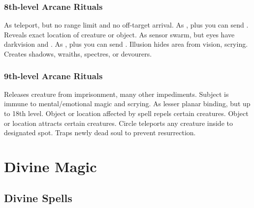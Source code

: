 \subsubsection{8th-level Arcane Rituals}
\begin{rituallist}
     As teleport, but no range limit and no off-target arrival.
     As , plus you can send .
     Reveals exact location of creature or object.
     As sensor swarm, but eyes have darkvision and .
     As , plus you can send .
     Illusion hides area from vision, scrying.
    \M Creates shadows, wraiths, spectres, or devourers.
\end{rituallist}

\subsubsection{9th-level Arcane Rituals}
\begin{rituallist}
     Releases creature from imprisonment, many other impediments.
     Subject is immune to mental/emotional magic and scrying.
     As lesser planar binding, but up to 18th level.
     Object or location affected by spell repels certain creatures.
    \F Object or location attracts certain creatures.
     Circle teleports any creature inside to designated spot.
    \F Traps newly dead soul to prevent resurrection.
\end{rituallist}

\section{Divine Magic}\label{Divine Magic}

\subsection{Divine Spells}\label{Divine Spells}

